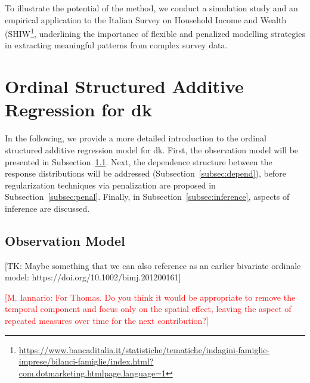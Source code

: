 \documentclass[submit]{smj}
\begin{document}
To illustrate the potential of the method, we conduct a simulation study and an empirical application to the Italian Survey on Household Income and Wealth (SHIW\footnote{\url{https://www.bancaditalia.it/statistiche/tematiche/indagini-famiglie-imprese/bilanci-famiglie/index.html?com.dotmarketing.htmlpage.language=1}}, underlining the importance of flexible and penalized modelling strategies in extracting meaningful patterns from complex survey data.

\section{Ordinal Structured Additive Regression for dk}\label{sec:2}

In the following, we provide a more detailed introduction to the ordinal structured additive regression model for dk. First, the observation model will be presented in Subsection~\ref{sec:obs:model}. Next, the dependence structure between the response distributions will be addressed (Subsection~\ref{subsec:depend}), before regularization techniques via penalization are proposed in Subsection~\ref{subsec:penal}. Finally, in Subsection~\ref{subsec:inference}, aspects of inference are discussed.

\subsection{Observation Model}\label{sec:obs:model}

[TK: Maybe something that we can also reference as an earlier bivariate ordinale model: https://doi.org/10.1002/bimj.201200161]

\textcolor{red}{[M. Iannario: For Thomas. Do you think it would be appropriate to remove the temporal component and focus only on the spatial effect, leaving the aspect of repeated measures over time for the next contribution?]}
\end{document}
